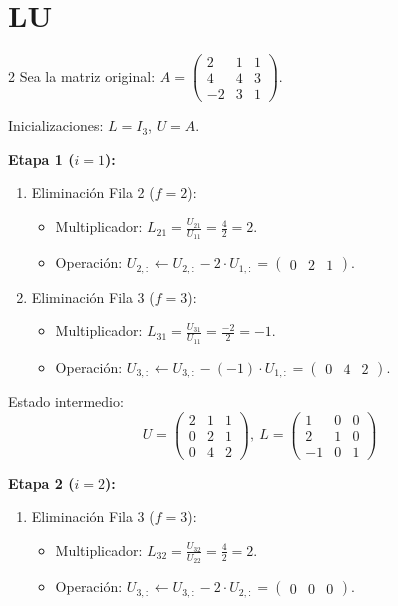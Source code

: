 \documentclass[10pt]{extarticle}
\begin{document}
\section*{LU}
\begin{multicols}{2}
Sea la matriz original: $A = \begin{pmatrix}2&1&1\\4&4&3\\-2&3&1\end{pmatrix}$.

Inicializaciones: $L=I_3$, $U=A$.

\textbf{Etapa 1 ($i=1$):}
\begin{enumerate}
\item Eliminación Fila 2 ($f=2$):
\begin{itemize}[leftmargin=1.2em]
\item Multiplicador: $L_{21}=\frac{U_{21}}{U_{11}}=\frac{4}{2}=2$.
\item Operación: $U_{2,:}\leftarrow U_{2,:}-2\cdot U_{1,:} = \begin{pmatrix}0&2&1\end{pmatrix}$.
\end{itemize}
\item Eliminación Fila 3 ($f=3$):
\begin{itemize}[leftmargin=1.2em]
\item Multiplicador: $L_{31}=\frac{U_{31}}{U_{11}}=\frac{-2}{2}=-1$.
\item Operación: $U_{3,:}\leftarrow U_{3,:}-(-1)\cdot U_{1,:} = \begin{pmatrix}0&4&2\end{pmatrix}$.
\end{itemize}
\end{enumerate}

Estado intermedio:
$$U=\begin{pmatrix}2&1&1\\0&2&1\\0&4&2\end{pmatrix},\ L=\begin{pmatrix}1&0&0\\2&1&0\\-1&0&1\end{pmatrix}$$

\textbf{Etapa 2 ($i=2$):}
\begin{enumerate}
\item Eliminación Fila 3 ($f=3$):
\begin{itemize}[leftmargin=1.2em]
\item Multiplicador: $L_{32}=\frac{U_{32}}{U_{22}}=\frac{4}{2}=2$.
\item Operación: $U_{3,:}\leftarrow U_{3,:}-2\cdot U_{2,:} = \begin{pmatrix}0&0&0\end{pmatrix}$.
\end{itemize}
\end{enumerate}


\end{multicols}
\end{document}
